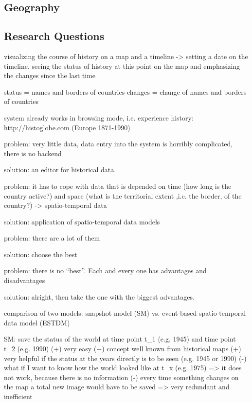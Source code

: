 

\subsection{Geography} %
\label{sub:geography}



\subsection{Research Questions} %
\label{sub:research_questions}





visualizing the course of history on a map and a timeline
-> setting a date on the timeline, seeing the status of history at this point on the map and emphasizing the changes since the last time

status = names and borders of countries
changes = change of names and borders of countries

system already works in browsing mode, i.e. experience history:
http://histoglobe.com
(Europe 1871-1990)

problem: very little data, data entry into the system is horribly complicated, there is no backend

solution: an editor for historical data.

problem: it has to cope with data that is depended on time (how long is the country active?) and space (what is the territorial extent ,i.e. the border, of the country?) -> spatio-temporal data

solution: application of spatio-temporal data models

problem: there are a lot of them

solution: choose the best

problem: there is no ``best''. Each and every one has advantages and disadvantages

solution: alright, then take the one with the biggest advantages.

comparison of two models: snapshot model (SM) vs. event-based spatio-temporal data model (ESTDM)

SM: save the status of the world at time point t\_1 (e.g. 1945) and time point t\_2 (e.g. 1990)
(+) very easy
(+) concept well known from historical maps
(+) very helpful if the status at the years directly is to be seen (e.g. 1945 or 1990)
(-) what if I want to know how the world looked like at t\_x (e.g. 1975)
=> it does not work, because there is no information
(-) every time something changes on the map a total new image would have to be saved
=> very redundant and inefficient

